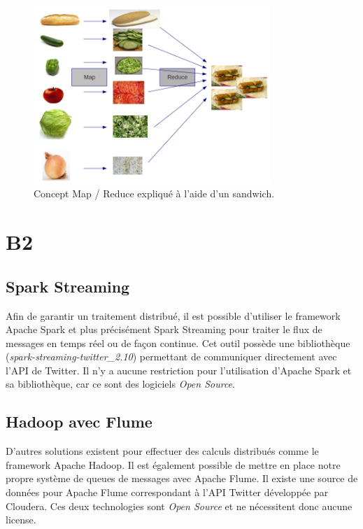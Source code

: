   \begin{figure}
    \centering
    \includegraphics[width=0.8\textwidth]{images/mapreduce.png}
    \caption{Concept Map / Reduce expliqué à l'aide d'un sandwich.}
    \label{mapreduce}
  \end{figure}

\section{B2}
\label{sec:B2}
  \subsection{Spark Streaming}
  Afin de garantir un traitement distribué, il est possible d'utiliser le framework Apache Spark et plus précisément Spark Streaming pour traiter le flux de messages en temps réel ou de façon continue. Cet outil possède une bibliothèque (\emph{spark-streaming-twitter\_2.10}) permettant de communiquer directement avec l'API de Twitter. Il n'y a aucune restriction pour l'utilisation d'Apache Spark et sa bibliothèque, car ce sont des logiciels \emph{Open Source}.

  \subsection{Hadoop avec Flume}
  \label{sub:Hadoop avec Flume}
  D'autres solutions existent pour effectuer des calculs distribués comme le framework Apache Hadoop. Il est également possible de mettre en place notre propre système de queues de messages avec Apache Flume. Il existe une source de données pour Apache Flume correspondant à l'API Twitter développée par Cloudera. Ces deux technologies sont \emph{Open Source} et ne nécessitent donc aucune license.

